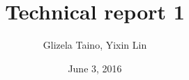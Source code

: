 \documentclass{article}
\begin{document}
\title{Technical report 1}
\author{Glizela Taino, Yixin Lin}
\date{June 3, 2016}
\maketitle







\newpage


\end{document}
